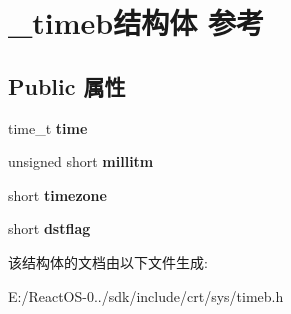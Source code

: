 \hypertarget{struct__timeb}{}\section{\+\_\+timeb结构体 参考}
\label{struct__timeb}
\subsection*{Public 属性}
\begin{DoxyCompactItemize}
\item 
\mbox{\label{struct__timeb_a928964f8921238f2f1cd9b00156c2193}} 
time\+\_\+t {\bfseries time}
\item 
\mbox{\label{struct__timeb_a975ceacec134ed49ae57e8f5c4818508}} 
unsigned short {\bfseries millitm}
\item 
\mbox{\label{struct__timeb_a9b12daae5dfc9bd4a2b60836da302d01}} 
short {\bfseries timezone}
\item 
\mbox{\label{struct__timeb_a43a79bdcf9506128af4cfa1d08ce722f}} 
short {\bfseries dstflag}
\end{DoxyCompactItemize}


该结构体的文档由以下文件生成\+:\begin{DoxyCompactItemize}
\item 
E\+:/\+React\+O\+S-\/0../sdk/include/crt/sys/timeb.\+h\end{DoxyCompactItemize}
